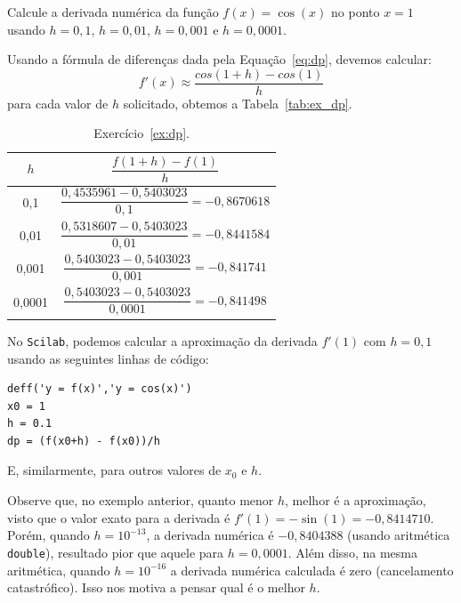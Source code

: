 \begin{ex}\label{ex:dp}
Calcule a derivada numérica da função $f(x)=\cos(x)$ no ponto $x=1$ usando $h=0,1$, $h=0,01$, $h=0,001$ e $h=0,0001$.
\end{ex}
\begin{sol}
Usando a fórmula de diferenças dada pela Equação~\eqref{eq:dp}, devemos calcular:
\begin{equation*}
  f'(x) \approx \frac{cos(1 + h) - cos(1)}{h}
\end{equation*}
para cada valor de $h$ solicitado, obtemos a Tabela~\ref{tab:ex_dp}.

\begin{table}
  \centering
  \begin{tabular}{|c|c|}\hline
    $h$ & $\dfrac{f(1+h)-f(1)}{h}$ \\ \hline
    0,1 & $\displaystyle \dfrac{0,4535961-0,5403023}{0,1}=- 0,8670618$\\\hline
    0,01 & $\displaystyle \dfrac{0,5318607-0,5403023}{0,01}=- 0,8441584$\\\hline
    0,001 & $\displaystyle \dfrac{0,5403023-0,5403023}{0,001}=- 0,841741$\\\hline
    0,0001 & $\displaystyle \dfrac{0,5403023-0,5403023}{0,0001}=-0,841498$\\\hline
  \end{tabular}
  \caption{Exercício~\ref{ex:dp}.}
  \label{tab:ex-dp}
\end{table}
\ifisscilab
No \verb+Scilab+, podemos calcular a aproximação da derivada $f'(1)$ com $h=0,1$ usando as seguintes linhas de código:
\begin{verbatim}
deff('y = f(x)','y = cos(x)')
x0 = 1
h = 0.1
dp = (f(x0+h) - f(x0))/h
\end{verbatim}
E, similarmente, para outros valores de $x_0$ e $h$. 
\fi
\end{sol}

Observe que, no exemplo anterior, quanto menor $h$, melhor é a aproximação, visto que o valor exato para a derivada é $f'(1)=-\sin(1)=-0,8414710$. Porém, quando $h=10^{-13}$, a derivada numérica é $-0,8404388$ (usando aritmética \verb+double+), resultado pior que aquele para $h=0,0001$. Além disso, na mesma aritmética, quando $h=10^{-16}$ a derivada numérica calculada é zero (cancelamento catastrófico). Isso nos motiva a pensar qual é o melhor $h$.  

